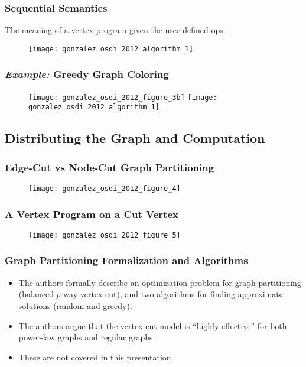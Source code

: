 \begin{frame}
  \frametitle{Sequential Semantics}
  The meaning of a vertex program given the user-defined ops:
  \begin{figure}
    \centering
    \texttt{[image: gonzalez\_osdi\_2012\_algorithm\_1]}
    \caption{\cite[OSDI '12]{gonzalez2012powergraph}}
  \end{figure}
\end{frame}

\begin{frame}
  \frametitle{\textit{Example:} Greedy Graph Coloring}
  \begin{figure}
    \centering
    \texttt{[image: gonzalez\_osdi\_2012\_figure\_3b]}%
    \texttt{[image: gonzalez\_osdi\_2012\_algorithm\_1]}
    \caption{\cite[OSDI '12]{gonzalez2012powergraph}}
  \end{figure}
\end{frame}


\subsection{Distributing the Graph and Computation}

\begin{frame}
  \frametitle{Edge-Cut vs Node-Cut Graph Partitioning}
  \begin{figure}
    \centering
    \texttt{[image: gonzalez\_osdi\_2012\_figure\_4]}
    \caption{\cite[OSDI '12]{gonzalez2012powergraph}}
  \end{figure}
\end{frame}

\begin{frame}
  \frametitle{A Vertex Program on a Cut Vertex}
  \begin{figure}
    \centering
    \texttt{[image: gonzalez\_osdi\_2012\_figure\_5]}
    \caption{\cite[OSDI '12]{gonzalez2012powergraph}}
  \end{figure}
\end{frame}

\begin{frame}
  \frametitle{Graph Partitioning Formalization and Algorithms}
  \begin{itemize}
    \item The authors formally describe an optimization problem for graph
          partitioning (balanced $p$-way vertex-cut), and two algorithms for
          finding approximate solutions (random and greedy).
    \item The authors argue that the vertex-cut model is ``highly effective''
          for both power-law graphs and regular graphs.~\cite[OSDI '12]{gonzalez2012powergraph}
    \item These are not covered in this presentation.
  \end{itemize}
\end{frame}


